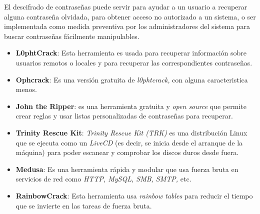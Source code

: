 \documentclass[bibliography=totocnumbered]{scrartcl}
\begin{document}
El descifrado de contraseñas puede servir para ayudar a un usuario a recuperar alguna contraseña olvidada, para obtener acceso no autorizado a un sistema, o ser implementada como medida preventiva por los administradores del sistema para buscar contraseñas fácilmente manipulables.

\begin{itemize}
    \item \textbf{L0phtCrack}\parencite{l0phtcrack}: Esta herramienta es usada para recuperar información sobre usuarios remotos o locales y para recuperar las correspondientes contraseñas.
    \item \textbf{Ophcrack}\parencite{ophcrack}: Es una versión gratuita de \textit{l0phtcrack}\parencite{l0phtcrack}, con alguna caracteristica menos.
    \item \textbf{John the Ripper}\parencite{john}: es una herramienta gratuita y \textit{open source} que permite crear reglas y usar listas personalizadas de contraseñas para recuperar.
    \item \textbf{Trinity Rescue Kit}\parencite{trinity}: \textit{Trinity Rescue Kit (TRK)} es una distribución Linux que se ejecuta como un \textit{LiveCD} (es decir, se inicia desde el arranque de la máquina) para poder escanear y comprobar los discos duros desde fuera.
    \item \textbf{Medusa}\parencite{medusa}: Es una herramienta rápida y modular que usa fuerza bruta en servicios de red como \textit{HTTP, MySQL, SMB, SMTP,} etc.
    \item \textbf{RainbowCrack}\parencite{rainbow}: Esta herramienta usa \textit{rainbow tables}\parencite{rainbowTables} para reducir el tiempo que se invierte en las tareas de fuerza bruta.
\end{itemize}
\newpage
\end{document}
